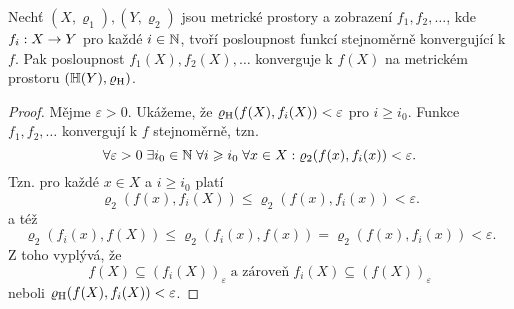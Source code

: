 \begin{theorem}\label{thm:stejnometrna-konvergence-hmp}
    Nechť $(X,\varrho_1),(Y,\varrho_2)$ jsou metrické prostory a zobrazení $f_1,f_2,\ldots$, kde $f_i:X \rightarrow Y$ pro každé $i\in\mathbb{N}$, tvoří posloupnost funkcí stejnoměrně konvergující k $f$. Pak posloupnost $f_1(X),f_2(X),\ldots$ konverguje k $f(X)$ na metrickém prostoru $(\mathbb{H}(Y),\varrho_\textup{H})$.
\end{theorem}
\begin{proof}
    Mějme $\varepsilon>0$. Ukážeme, že $\varrho_\textup{H}(f(X),f_i(X))<\varepsilon$ pro $i\geqslant i_0$. Funkce $f_1,f_2,\ldots$ konvergují k $f$ stejnoměrně, tzn.
    \[\forall\varepsilon>0\;\exists i_0\in\mathbb{N}\;\forall i\geqslant i_0\;\forall x\in X:\varrho_2(f(x),f_i(x))<\varepsilon.\]
    Tzn. pro každé $x\in X$ a $i\geqslant i_0$ platí
    \[\varrho_2(f(x),f_i(X))\leqslant\varrho_2(f(x),f_i(x))<\varepsilon.\]
    a též
    \[\varrho_2(f_i(x),f(X))\leqslant\varrho_2(f_i(x),f(x))=\varrho_2(f(x),f_i(x))<\varepsilon.\]
    Z toho vyplývá, že
    \[f(X)\subseteq (f_i(X))_\varepsilon\;\text{a zároveň}\;f_i(X)\subseteq (f(X))_\varepsilon\]
    neboli $\varrho_\textup{H}(f(X),f_i(X))<\varepsilon$.
\end{proof}